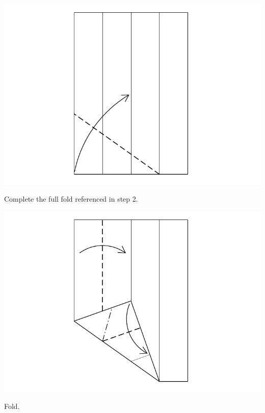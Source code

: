 \documentclass[11pt]{article}
\begin{document}
\begin{minipage}[t]{0.45\textwidth}
  \includegraphics[width=\textwidth]{../figs/fig05-04}
  \begin{itemize}{\item[4.] Complete the full fold referenced in step 2.}\end{itemize}
\end{minipage}
\hfill
\begin{minipage}[t]{0.45\textwidth}
  \includegraphics[width=\textwidth]{../figs/fig05-05}
  \begin{itemize}{\item[5.] Fold.}\end{itemize}
\end{minipage}

\vspace*{0.5in}
\end{document}
